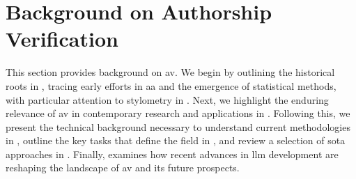 \chapter{Background on Authorship Verification}
\label{chap:authorship_identification}

This section provides background on \acf{av}.
We begin by outlining the historical roots in , tracing early efforts in \ac{aa} and the emergence of statistical methods, with particular attention to stylometry in .
Next, we highlight the enduring relevance of \ac{av} in contemporary research and applications in .
Following this, we present the technical background necessary to understand current methodologies in , outline the key tasks that define the field in , and review a selection of \acl{sota} approaches in .
Finally,  examines how recent advances in \ac{llm} development are reshaping the landscape of \ac{av} and its future prospects.










% 




